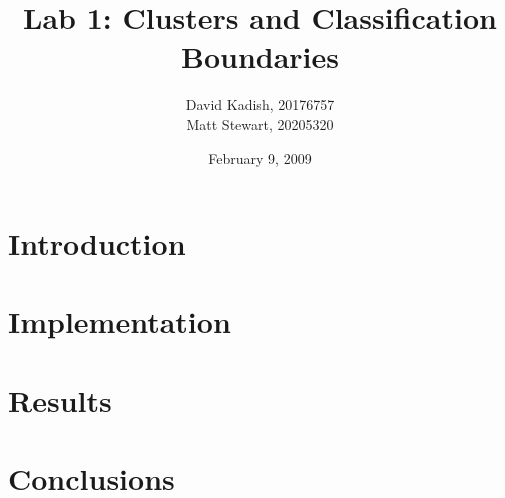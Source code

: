 \documentclass[12pt]{sydeStyle}
\title{Lab 1: Clusters and Classification Boundaries}
\author{
    David Kadish, 20176757\\
    Matt Stewart, 20205320
}
\date{February 9, 2009}
\begin{document}

\maketitle

\setcounter{page}{2} %


\chapter{Introduction}


\chapter{Implementation}

\chapter{Results}

\chapter{Conclusions}

\appendix
\renewcommand{\thechapter}{\Alph{chapter}}
\end{document}
